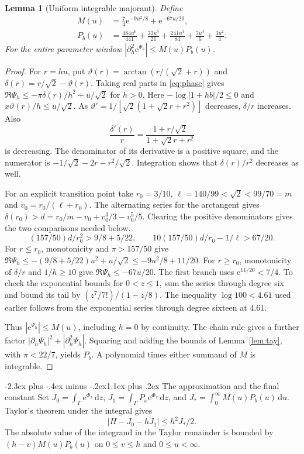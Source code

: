 \documentclass[11pt,a4paper]{article}
\makeatletter
\newtheorem{lemma}[theorem]{Lemma}
\newcommand{\dd}{\,\mathrm d}
\newcommand{\e}{\mathrm e}
\renewcommand\section{\@startsection{section}{1}{\z@}
  {-2.3ex plus -.4ex minus -.2ex}{1.1ex plus .2ex}
  {\normalfont\large\bfseries\centering}}
\makeatother
\begin{document}
\begin{lemma}[Uniform integrable majorant]\label{lem:uniform}
Define
\begin{align}
 M(u)&=\tfrac74\e^{-9u^2/8}+\e^{-67u/20},\\
 P_b(u)&=\frac{484 u^6}{441}+\frac{22 u^5}{21}+\frac{241 u^4}{84}+\frac{7 u^3}{6}+\frac{3 u^2}{4} .
\end{align}
For the entire parameter window
$|\partial_h^2 \e^{\Psi_h}|\le M(u)P_b(u)$.
\end{lemma}
\begin{proof}
For $r=hu$, put $\vartheta(r)=\arctan(r/(\sqrt2+r))$ and
$\delta(r)=r/\sqrt2-\vartheta(r)$. Taking real parts in \eqref{eq:phase}
gives $\Re\Psi_h\le-\pi\delta(r)/h^2+u/\sqrt2$ for $h>0$.
Here $-\log|1+hb|/2\le0$ and $x\vartheta(r)/h\le u/\sqrt2$.
As $\vartheta'=1/[\sqrt2(1+\sqrt2r+r^2)]$ decreases, $\delta/r$
increases. Also
\[
 \frac{\delta'(r)}r=\frac{1+r/\sqrt2}{1+\sqrt2r+r^2}
\]
is decreasing. The denominator of its derivative is a positive square, and the numerator is $-1/\sqrt2-2r-r^2/\sqrt2$.
Integration shows that $\delta(r)/r^2$ decreases as well.

For an explicit transition point take $r_0=3/10$,
$\ell=140/99<\sqrt2<99/70=m$ and $v_0=r_0/(\ell+r_0)$.
The alternating series for the arctangent gives
$\delta(r_0)>d=r_0/m-v_0+v_0^3/3-v_0^5/5$.
Clearing the positive denominators gives the two comparisons needed below.
\[
 (157/50)d/r_0^2>9/8+5/22,\qquad
 10(157/50)d/r_0-1/\ell>67/20.
\]
For $r\le r_0$, monotonicity and $\pi>157/50$ give
$\Re\Psi_h\le-(9/8+5/22)u^2+u/\sqrt2\le-9u^2/8+11/20$.
For $r\ge r_0$, monotonicity of $\delta/r$ and $1/h\ge10$ give
$\Re\Psi_h\le-67u/20$. The first branch uses $\e^{11/20}<7/4$.
To check the exponential bounds for
$0<z\le1$, sum the series through degree six and bound its tail by $(z^7/7!)/(1-z/8)$. The inequality $\log100<4.61$ used earlier
follows from the exponential series through degree sixteen at $4.61$.

Thus $|\e^{\Psi_h}|\le M(u)$, including $h=0$ by continuity.
The chain rule gives a further factor
$|\partial_h\Psi_h|^2+|\partial_h^2\Psi_h|$. Squaring and adding
the bounds of Lemma~\ref{lem:tay}, with $\pi<22/7$, yields $P_b$.
A polynomial times either summand of $M$ is integrable.
\end{proof}

\section{The approximation and the final constant}
Set $J_0=\int_\Gamma\e^{\Phi_x}\dd z$,
$J_1=\int_\Gamma P_x\e^{\Phi_x}\dd z$, and
$J_*=\int_0^\infty M(u)P_b(u)\dd u$. Taylor's theorem under the
integral gives
\begin{equation}\label{eq:remainder}
 |H-J_0-hJ_1|\le h^2 J_*/2 .
\end{equation}
The absolute value of the integrand in the Taylor remainder is bounded by
$(h-v)M(u)P_b(u)$ on $0\le v\le h$ and $0\le u<\infty$.
\end{document}
